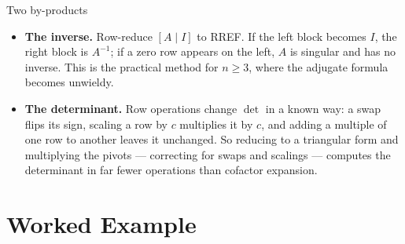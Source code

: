 \begin{rulebox}{Two by-products}
\begin{itemize}[leftmargin=1.6em,itemsep=0.35ex]
  \item \textbf{The inverse.} Row-reduce $[A\mid I]$ to RREF. If the left
        block becomes $I$, the right block is $A^{-1}$; if a zero row
        appears on the left, $A$ is singular and has no inverse. This is the
        practical method for $n\ge3$, where the adjugate formula becomes
        unwieldy.
  \item \textbf{The determinant.} Row operations change $\det$ in a known
        way: a swap flips its sign, scaling a row by $c$ multiplies it by
        $c$, and adding a multiple of one row to another leaves it
        unchanged. So reducing to a triangular form and multiplying the
        pivots --- correcting for swaps and scalings --- computes the
        determinant in far fewer operations than cofactor expansion.
\end{itemize}
\end{rulebox}

\section{Worked Example}

